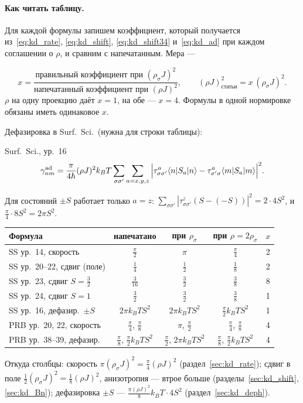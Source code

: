\paragraph{Как читать таблицу.} Для каждой формулы запишем коэффициент,
который получается из~\eqref{eq:kd_rate}, \eqref{eq:kd_shift}, \eqref{eq:kd_shift34}
и~\eqref{eq:kd_ad} при каждом соглашении о $\rho$, и сравним с напечатанным. Мера ---
\begin{resbox}
\[
x=\frac{\text{правильный коэффициент при }(\rho_\sigma J)^2}{\text{напечатанный коэффициент при }(\rho J)^2},
\qquad (\rho J)^2_{\text{статьи}}=x\,(\rho_\sigma J)^2 .
\]
$\rho$ на одну проекцию даёт $x=1$, на обе --- $x=4$. Формулы в одной нормировке
обязаны иметь одинаковое $x$.
\end{resbox}

Дефазировка в Surf.\ Sci.\ (нужна для строки таблицы):
\begin{paperbox}{Surf.\ Sci., ур.~16}
\[
\gamma^{\rm ad}_{nm}=\frac{\pi}{4\hbar}(\rho J)^2k_BT\sum_{\sigma\sigma'}\sum_{a=x,y,z}
\Big|\tau^a_{\sigma\sigma'}\langle n|S_a|n\rangle-\tau^a_{\sigma'\sigma}\langle m|S_a|m\rangle\Big|^2 .
\]
\end{paperbox}
Для состояний $\pm S$ работает только $a=z$:
$\sum_{\sigma\sigma'}|\tau^z_{\sigma\sigma'}(S-(-S))|^2=2\cdot4S^2$, и
$\tfrac\pi4\cdot8S^2=2\pi S^2$.

\begin{center}\small
\begin{tabular}{p{4.7cm}cccc}
\toprule
Формула & напечатано & при $\rho_\sigma$ & при $\rho=2\rho_\sigma$ & $x$ \\
\midrule
SS ур.~14, скорость & $\tfrac\pi2$ & $\pi$ & $\tfrac\pi4$ & 2 \\
SS ур.~20--22, сдвиг (поле) & $\tfrac14$ & $\tfrac12$ & $\tfrac18$ & 2 \\
SS ур.~23, сдвиг $S=\tfrac32$ & $\tfrac3{16}$ & $\tfrac32$ & $\tfrac38$ & 8 \\
SS ур.~24, сдвиг $S=1$ & $\tfrac32$ & $\tfrac32$ & $\tfrac38$ & 1 \\
SS ур.~16, дефазир.\ $\pm S$ & $2\pi k_BTS^2$ & $2\pi k_BTS^2$ & $\tfrac\pi2k_BTS^2$ & 1 \\
PRB ур.~20, 22, скорость & $\tfrac\pi4$, $\tfrac\pi8$ & $\pi$, $\tfrac\pi2$ & $\tfrac\pi4$, $\tfrac\pi8$ & 4 \\
PRB ур.~38--39, дефазир. & $\tfrac\pi8$, $\tfrac\pi2k_BTS^2$ & $\tfrac\pi2$, $2\pi k_BTS^2$ & $\tfrac\pi8$, $\tfrac\pi2k_BTS^2$ & 4 \\
\bottomrule
\end{tabular}
\end{center}
Откуда столбцы: скорость $\pi(\rho_\sigma J)^2=\tfrac\pi4(\rho J)^2$ (раздел~\ref{sec:kd_rate}); сдвиг в
поле $\tfrac12(\rho_\sigma J)^2=\tfrac18(\rho J)^2$, анизотропия --- втрое больше
(разделы~\ref{sec:kd_shift}, \ref{sec:kd_Bn}); дефазировка $\pm S$ ---
$\tfrac{\pi(\rho J)^2}{8}k_BT\cdot4S^2$ (раздел~\ref{sec:kd_deph}).

